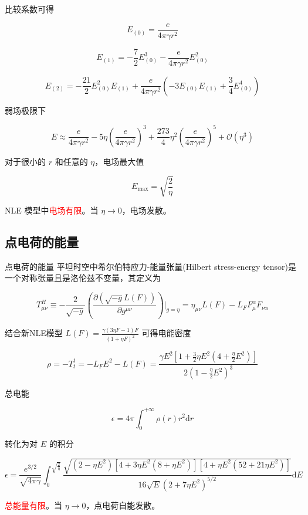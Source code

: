 \documentclass[9pt, dvipsnames]{beamer} %
\begin{document}
\begin{frame}
    比较系数可得
    
    $$
    E_{(0)}
    =\frac{e }{4\pi\gamma r^2 }
    $$
    
    $$
    E_{(1)} 
    =-\frac{7 }{2 } E_{(0)}^3 - \frac{e }{4\pi \gamma r^2 } E_{(0)}^2
    $$
    
    $$
    E_{(2)}
    =-\frac{21 }{2 } E_{(0)}^2 E_{(1)} + \frac{e }{4\pi\gamma r^2 } \left(-3E_{(0)}E_{(1)} + \frac{3 }{4 } E_{(0)}^4 \right)
    $$
    
    弱场极限下
    
    $$
    E
    \approx \frac{e }{4\pi\gamma r^2 } - 5\eta\left(\frac{e }{4\pi\gamma r^2 }  \right)^3 + \frac{273 }{4 } \eta^2\left(\frac{e }{4\pi\gamma r^2 }  \right)^5 + \mathcal{O}\left(\eta^3 \right)
    $$
    
    对于很小的 $r$ 和任意的 $\eta$，电场最大值
    
    $$
    \boxed{
    E_{\max}
    =\sqrt{\frac{2 }{\eta } }
    }
    $$
    
    NLE 模型中\textcolor{red}{电场有限}。当 $\eta\to 0 $，电场发散。
    
\end{frame}

\subsection{点电荷的能量}

\begin{frame}{点电荷的能量}
    平坦时空中希尔伯特应力-能量张量(Hilbert stress-energy tensor)是一个对称张量且是洛伦兹不变量，其定义为

    $$
    T_{\mu\nu}^H
    \equiv -\frac{2 }{\sqrt{-g} } \left(\frac{\partial \left(\sqrt{-g}L(F) \right) }{\partial g^{\mu\nu} }  \right)\bigg|_{g=\eta}
    =\eta_{\mu\nu}L(F) - L_FF_\mu^\alpha F_{\nu\alpha}
    $$

    结合新NLE模型 $L(F)=\frac{\gamma(3\eta F-1)F }{(1+\eta F)^2 } $ 可得电能密度
    
    $$
    \rho
    =-T_t^t
    =-L_FE^2-L(F)
    =\frac{\gamma E^2\left[1+\frac{3 }{2 } \eta E^2 \left(4+\frac{\eta }{2 } E^2 \right) \right] }{2\left(1-\frac{\eta }{2 } E^2 \right)^3 } 
    $$
    
    总电能
    
    $$
    \epsilon
    =4\pi\int_{0}^{+\infty} \rho(r)r^2\mathrm{d}r
    $$ 
    
    转化为对 $E $ 的积分
    
    $$
    \epsilon
    =\frac{e^{3/2} }{\sqrt{4\pi\gamma} } \int_{0}^{\sqrt{\frac{2 }{\eta  } }} \frac{\sqrt{\left(2-\eta E^2 \right)\left[4+3\eta E^2\left(8+\eta E^2 \right) \right]\left[4+\eta E^2\left(52+21\eta E^2 \right) \right]} }{16\sqrt{E}\left(2+7\eta E^2 \right)^{5/2} } \mathrm{d}E
    $$
    
    \textcolor{red}{总能量有限}。当 $\eta\to 0$，点电荷自能发散。
\end{frame}
\end{document}
